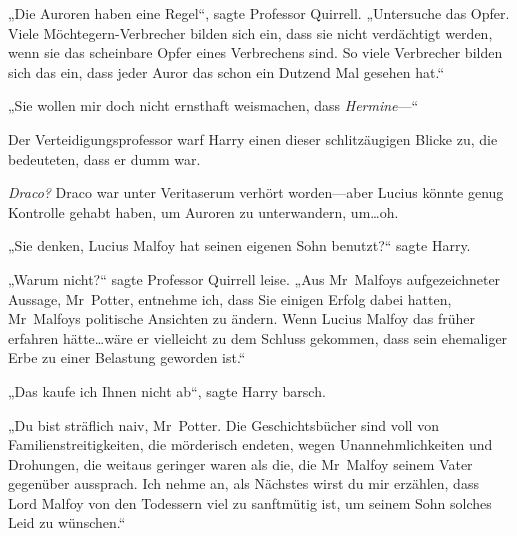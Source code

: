„Die Auroren haben eine Regel“, sagte Professor Quirrell. „Untersuche das Opfer. Viele Möchtegern-Verbrecher bilden sich ein, dass sie nicht verdächtigt werden, wenn sie das scheinbare Opfer eines Verbrechens sind. So viele Verbrecher bilden sich das ein, dass jeder Auror das schon ein Dutzend Mal gesehen hat.“

„Sie wollen mir doch nicht ernsthaft weismachen, dass \emph{Hermine}—“

Der Verteidigungsprofessor warf Harry einen dieser schlitzäugigen Blicke zu, die bedeuteten, dass er dumm war.

\emph{Draco?} Draco war unter Veritaserum verhört worden—aber Lucius könnte genug Kontrolle gehabt haben, um Auroren zu unterwandern, um…oh.

„Sie denken, Lucius Malfoy hat seinen eigenen Sohn benutzt?“ sagte Harry.

„Warum nicht?“ sagte Professor Quirrell leise. „Aus Mr~Malfoys aufgezeichneter Aussage, Mr~Potter, entnehme ich, dass Sie einigen Erfolg dabei hatten, Mr~Malfoys politische Ansichten zu ändern. Wenn Lucius Malfoy das früher erfahren hätte…wäre er vielleicht zu dem Schluss gekommen, dass sein ehemaliger Erbe zu einer Belastung geworden ist.“

„Das kaufe ich Ihnen nicht ab“, sagte Harry barsch.

„Du bist sträflich naiv, Mr~Potter. Die Geschichtsbücher sind voll von Familienstreitigkeiten, die mörderisch endeten, wegen Unannehmlichkeiten und Drohungen, die weitaus geringer waren als die, die Mr~Malfoy seinem Vater gegenüber aussprach. Ich nehme an, als Nächstes wirst du mir erzählen, dass Lord Malfoy von den Todessern viel zu sanftmütig ist, um seinem Sohn solches Leid zu wünschen.“

